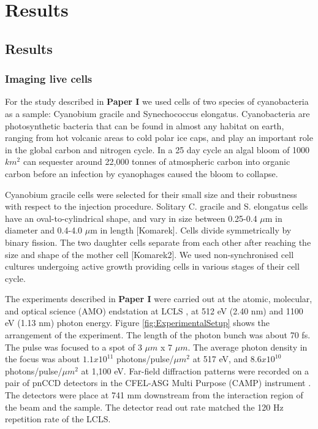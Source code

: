 \part{Results}
\chapter{Results}
\section{Imaging live cells}
For the study described in \textbf{Paper I} we used cells of two species of cyanobacteria as a sample: Cyanobium gracile and Synechococcus elongatus. Cyanobacteria are photosynthetic bacteria that can be found in almost any habitat on earth, ranging from hot volcanic areas to cold polar ice caps, and play an important role in the global carbon and nitrogen cycle. In a 25 day cycle an algal bloom of 1000 $km^2$ can sequester around 22,000 tonnes of atmospheric carbon into organic carbon before an infection by cyanophages caused the bloom to collapse.
 
Cyanobium gracile cells were selected for their small size and their robustness with respect to the injection procedure. Solitary C. gracile and S. elongatus cells have an oval-to-cylindrical shape, and vary in size between 0.25-0.4 $\mu$m in diameter and 0.4-4.0 $\mu$m in length [Komarek]. Cells divide symmetrically by binary fission. The two daughter cells separate from each other after reaching the size and shape of the mother cell [Komarek2]. We used non-synchronised cell cultures undergoing active growth providing cells in various stages of their cell cycle. 

The experiments described in \textbf{Paper I} were carried out at the atomic, molecular, and optical science (AMO) endstation at LCLS \cite{Bostedt2013}, at 512 eV (2.40 nm) and 1100 eV (1.13 nm) photon energy.  Figure \ref{fig:ExperimentalSetup} shows the arrangement of the experiment. The length of the photon bunch was about 70 fs. The pulse was focused to a spot of 3 $\mu m$ x 7 $\mu m$. The average photon density in the focus was about $1.1 x 10^{11}$ photons/pulse/$\mu m^2$ at 517 eV, and $8.6 x 10^{10}$ photons/pulse/$\mu m^2$ at 1,100 eV. Far-field diffraction patterns were recorded on a pair of pnCCD detectors \cite{Struder2010} in the CFEL-ASG Multi Purpose (CAMP) instrument \cite{Struder2010}. The detectors were place at 741 mm downstream from the interaction region of the beam and the sample. The detector read out rate matched the 120 Hz repetition rate of the LCLS. 

